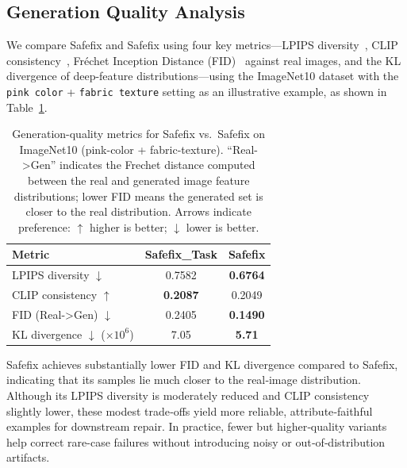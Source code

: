 \documentclass[10pt]{article} %
\newcommand{\model}{Safefix\xspace}
\newcommand{\hibug}{Safefix\xspace}
\begin{document}
\subsection{Generation Quality Analysis}
We compare \hibug{} and \model{} using four key metrics—LPIPS diversity~\citep{zhang2018unreasonable}, CLIP consistency~\citep{radford2021learning}, Fréchet Inception Distance (FID)~\citep{heusel2017gans} against real images, and the KL divergence of deep-feature distributions—using the ImageNet10 dataset with the \texttt{pink color} + \texttt{fabric texture} setting as an illustrative example, as shown in Table~\ref{tab:gen_metrics}.



\begin{table}[ht]
  \centering
  \small
  \setlength{\tabcolsep}{8pt}
  \renewcommand{\arraystretch}{1.1}
  \caption{Generation-quality metrics for \hibug{} vs.\ \model{} on ImageNet10 (pink-color + fabric-texture). ``Real->Gen'' indicates the Frechet distance computed between the real and generated image feature distributions; lower FID means the generated set is closer to the real distribution. Arrows indicate preference: $\uparrow$ higher is better; $\downarrow$ lower is better.}
  \label{tab:gen_metrics}
  \begin{tabular}{lcc}
    \toprule
    \textbf{Metric} & \textbf{Safefix\_Task}& \textbf{Safefix} \\
    \midrule
    LPIPS diversity $\downarrow$    & 0.7582           & \textbf{0.6764}   \\
    CLIP consistency $\uparrow$   & \textbf{0.2087}           & 0.2049   \\
    FID (Real->Gen) $\downarrow$      & 0.2405           & \textbf{0.1490}   \\
    KL divergence $\downarrow$ ($\times10^{6}$) & 7.05               & \textbf{5.71}   \\
    \bottomrule
  \end{tabular}
\end{table}

\model{} achieves substantially lower FID and KL divergence compared to \hibug{}, indicating that its samples lie much closer to the real‐image distribution. Although its LPIPS diversity is moderately reduced and CLIP consistency slightly lower, these modest trade‐offs yield more reliable, attribute‐faithful examples for downstream repair. In practice, fewer but higher‐quality variants help correct rare-case failures without introducing noisy or out‐of‐distribution artifacts.
\end{document}
